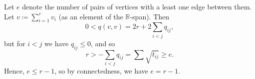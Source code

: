 Let $e$ denote the number of pairs of vertices with a least one edge between them.
Let $v\coloneqq\sum_{i=1}^r v_i$ (as an element of the $\mathbb{R}$-span). Then
\[ 0 < q(v, v) = 2r + 2\sum_{i < j} q_{ij}, \]
but for $i < j$ we have $q_{ij}\leq 0$, and so
\[ r > -\sum_{i < j} q_{ij} = \sum \sqrt{t_{ij}} \geq e. \]
Hence, $e\leq r - 1$, so by connectedness, we have  $e = r-1$.


